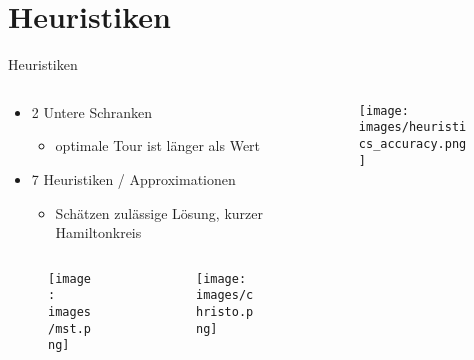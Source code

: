 \section{Heuristiken}
\begin{frame}{Heuristiken}
    \begin{columns}
        \begin{column}{0.6\textwidth}
            \begin{itemize}
                \item 2 Untere Schranken
                \begin{itemize}
                    \item optimale Tour ist länger als Wert
                \end{itemize}  
                \item 7 Heuristiken / Approximationen
                \begin{itemize}
                    \item Schätzen zulässige Lösung, kurzer Hamiltonkreis
                \end{itemize}
            \end{itemize}
            \begin{columns}[t]
                \begin{column}[t]{0.5\textwidth}
                    \begin{figure}
                        \texttt{[image: images/mst.png]}
                    \end{figure}
                \end{column} 
                \begin{column}[t]{0.5\textwidth}
                    \begin{figure}
                        \texttt{[image: images/christo.png]}
                    \end{figure}
                \end{column}
            \end{columns}
        \end{column}
        \begin{column}{0.4\textwidth}
            \begin{figure}
                \centering
                    \texttt{[image: images/heuristics\_accuracy.png]}
                \label{fig:enter-label}
            \end{figure}
        \end{column}
    \end{columns}
\end{frame}

